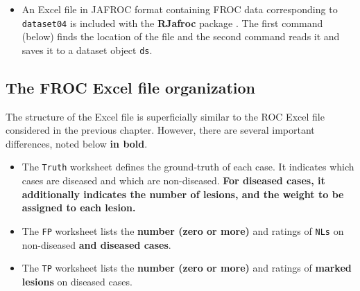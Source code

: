 \documentclass[]{book}
\newenvironment{Shaded}{\begin{snugshade}}{\end{snugshade}}
\newcommand{\CommentTok}[1]{\textcolor[rgb]{0.56,0.35,0.01}{\textit{#1}}}
\newcommand{\DataTypeTok}[1]{\textcolor[rgb]{0.13,0.29,0.53}{#1}}
\newcommand{\KeywordTok}[1]{\textcolor[rgb]{0.13,0.29,0.53}{\textbf{#1}}}
\newcommand{\NormalTok}[1]{#1}
\newcommand{\OperatorTok}[1]{\textcolor[rgb]{0.81,0.36,0.00}{\textbf{#1}}}
\newcommand{\OtherTok}[1]{\textcolor[rgb]{0.56,0.35,0.01}{#1}}
\newcommand{\StringTok}[1]{\textcolor[rgb]{0.31,0.60,0.02}{#1}}
\providecommand{\tightlist}{%
  \setlength{\itemsep}{0pt}\setlength{\parskip}{0pt}}
\begin{document}
\begin{itemize}
\tightlist
\item
  An Excel file in JAFROC format containing FROC data corresponding to \texttt{dataset04} is included with the \textbf{RJafroc} package \citep{RN1882}. The first command (below) finds the location of the file and the second command reads it and saves it to a dataset object \texttt{ds}.
\end{itemize}

\begin{Shaded}
\end{Shaded}

\hypertarget{the-froc-excel-file-organization}{%
\subsection{The FROC Excel file organization}\label{the-froc-excel-file-organization}}

The structure of the Excel file is superficially similar to the ROC Excel file considered in the previous chapter. However, there are several important differences, noted below \textbf{in bold}.

\begin{itemize}
\tightlist
\item
  The \texttt{Truth} worksheet defines the ground-truth of each case. It indicates which cases are diseased and which are non-diseased. \textbf{For diseased cases, it additionally indicates the number of lesions, and the weight to be assigned to each lesion.}
\item
  The \texttt{FP} worksheet lists the \textbf{number (zero or more)} and ratings of \texttt{NLs} on non-diseased \textbf{and diseased cases}.
\item
  The \texttt{TP} worksheet lists the \textbf{number (zero or more)} and ratings of \textbf{marked lesions} on diseased cases.
\end{itemize}
\end{document}
